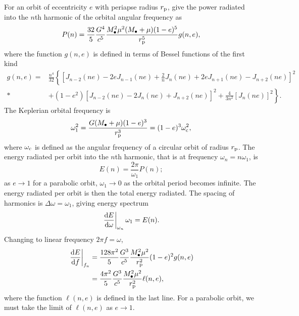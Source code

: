 For an orbit of eccentricity $e$ with periapse radius $r_\mathrm{p}$, \citet{Peters1963} give the power radiated into the $n$th harmonic of the orbital angular frequency as
\begin{equation}
P(n) = \frac{32}{5}\frac{G^4}{c^5}\frac{M_\bullet^2\mu^2(M_\bullet + \mu)(1-e)^5}{r_\mathrm{p}^5}g(n,e),
\label{eq:PM_P}
\end{equation}
where the function $g(n,e)$ is defined in terms of Bessel functions of the first kind
\begin{align}
g(n,e) = {} & \frac{n^4}{32}\left\{\left[J_{n-2}(ne) - 2eJ_{n-1}(ne) + \frac{2}{n}J_n(ne) + 2eJ_{n+1}(ne) - J_{n+2}(ne)\right]^2 \right. \nonumber \\*
 & + \left. \left(1 - e^2\right)\left[J_{n-2}(ne) - 2J_n(ne) + J_{n+2}(ne)\right]^2 + \frac{4}{3n^2}\left[J_n(ne)\right]^2\right\}.
\end{align}
The Keplerian orbital frequency is
\begin{equation}
\omega_1^2 = \frac{G(M_\bullet + \mu)(1 - e)^3}{r_\mathrm{p}^3} = (1 - e)^3\omega_\mathrm{c}^2,
\label{eq:Kepler_freq}
\end{equation}
where $\omega_\mathrm{c}$ is defined as the angular frequency of a circular orbit of radius $r_\mathrm{p}$. The energy radiated per orbit into the $n$th harmonic, that is at frequency $\omega_n = n\omega_1$, is
\begin{equation}
E(n) = \frac{2\pi}{\omega_1}P(n);
\label{eq:E(n)}
\end{equation}
as $e \rightarrow 1$ for a parabolic orbit, $\omega_1 \rightarrow 0$ as the orbital period becomes infinite. The energy radiated per orbit is then the total energy radiated. The spacing of harmonics is $\Delta\omega = \omega_1$, giving energy spectrum
\begin{equation}
\left.\frac{\mathrm{d} {E}}{\mathrm{d} {\omega}}\right|_{\omega_n}\omega_1 = E(n).
\end{equation}
Changing to linear frequency $2\pi f = \omega$,
\begin{align}
\left.\frac{\mathrm{d} {E}}{\mathrm{d} {f}}\right|_{f_n}  = {} & \frac{128\pi^2}{5}\frac{G^3}{c^5}\frac{M_\bullet^2\mu^2}{r_\mathrm{p}^2}(1-e)^2g(n,e) \\*
  = {} & \frac{4\pi^2}{5}\frac{G^3}{c^5}\frac{M_\bullet^2\mu^2}{r_\mathrm{p}^2}\ell(n,e),
\label{eq:PM_spectrum}
\end{align}
where the function $\ell(n,e)$ is defined in the last line. For a parabolic orbit, we must take the limit of $\ell(n,e)$ as $e \rightarrow 1$.

